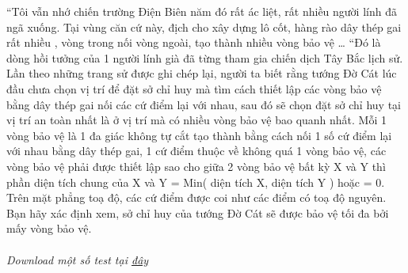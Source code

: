 “Tôi vẫn nhớ chiến trường Điện Biên năm đó rất ác liệt, rất nhiều người lính đã ngã xuống. Tại vùng căn cứ này, địch cho xây dựng lô cốt, hàng rào dây thép gai rất nhiều , vòng trong nối vòng ngoài, tạo thành nhiều vòng bảo vệ … “Đó là dòng hồi tưởng của 1 người lính già đã từng tham gia chiến dịch Tây Bắc lịch sử. Lần theo những trang sử được ghi chép lại, người ta biết rằng tướng Đờ Cát lúc đầu chưa chọn vị trí để đặt sở chỉ huy mà tìm cách thiết lập các vòng bảo vệ bằng dây thép gai nối các cứ điểm lại với nhau, sau đó sẽ chọn đặt sở chỉ huy tại vị trí an toàn nhất là ở vị trí mà có nhiều vòng bảo vệ bao quanh nhất. Mỗi 1 vòng bảo vệ là 1 đa giác không tự cắt tạo thành bằng cách nối 1 số cứ điểm lại với nhau bằng dây thép gai, 1 cứ điểm thuộc về không quá 1 vòng bảo vệ, các vòng bảo vệ phải được thiết lập sao cho giữa 2 vòng bảo vệ bất kỳ X và Y thì phần diện tích chung của X và Y = Min( diện tích X, diện tích Y ) hoặc = 0. Trên mặt phẳng toạ độ, các cứ điểm được coi như các điểm có toạ độ nguyên. Bạn hãy xác định xem, sở chỉ huy của tướng Đờ Cát sẽ được bảo vệ tối đa bởi mấy vòng bảo vệ.   
\\
\\\textit{    Download một số test tại    \href{http://vn.spoj.pl/content/MILITARY.rar}{     đây    }}
